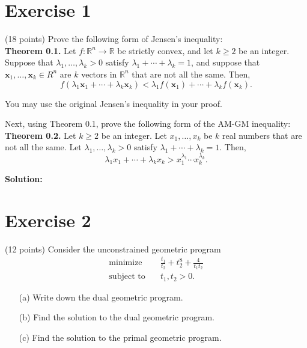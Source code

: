 \documentclass{article}
\begin{document}
\section*{Exercise 1}
(18 points) Prove the following form of Jensen's inequality: \\

\textbf{Theorem 0.1.} Let $f : \mathbb{R}^n \to \mathbb{R}$ be strictly convex, and let $k \geq 2$ be an integer. Suppose that $\lambda_1, \ldots, \lambda_k > 0$ satisfy $\lambda_1 + \cdots + \lambda_k = 1$, and suppose that $\mathbf{x}_1, \ldots, \mathbf{x}_k \in R^n$ are $k$ vectors in $\mathbb{R}^n$ that are not all the same. Then,
\[
f(\lambda_1 \mathbf{x}_1 + \cdots + \lambda_k \mathbf{x}_k) < \lambda_1 f(\mathbf{x}_1) + \cdots + \lambda_k f(\mathbf{x}_k).
\]

You may use the original Jensen's inequality in your proof.

Next, using Theorem 0.1, prove the following form of the AM-GM inequality: \\

\textbf{Theorem 0.2.} Let $k \geq 2$ be an integer. Let $x_1, \ldots, x_k$ be $k$ real numbers that are not all the same. Let $\lambda_1, \ldots, \lambda_k > 0$ satisfy $\lambda_1 + \cdots + \lambda_k = 1$. Then,
\[
\lambda_1 x_1 + \cdots + \lambda_k x_k > x_1^{\lambda_1} \cdots x_k^{\lambda_k}.
\]

\textbf{Solution:} \\



\newpage

\section*{Exercise 2}
(12 points) Consider the unconstrained geometric program
\begin{align*}
\text{minimize} \quad & \frac{t_1}{t_2} + t_2^8 + \frac{4}{t_1 t_2} \\
\text{subject to} \quad & t_1, t_2 > 0.
\end{align*}

\begin{itemize}
    \item[(a)] Write down the dual geometric program.
    \item[(b)] Find the solution to the dual geometric program.
    \item[(c)] Find the solution to the primal geometric program.
\end{itemize}
\end{document}
